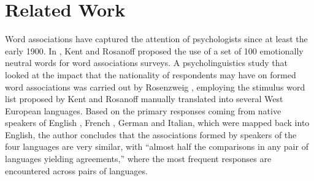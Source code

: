 \documentclass[11pt,letterpaper]{article}
\begin{document}
\section{Related Work}
Word associations have captured the attention of psychologists since at least the early 1900. In , Kent and Rosanoff proposed the use of a set of 100 emotionally neutral words for word associations surveys. %
A psycholinguistics study that looked at the impact that the nationality of respondents may have on formed word associations was carried out by Rosenzweig , employing the stimulus word list proposed by Kent and Rosanoff  manually translated into several West European languages. Based on the primary responses coming from native speakers of English%
, French%
, German %
and Italian, %
which were mapped back into English, the author concludes that the associations formed by speakers of the four languages are very similar, with ``almost half the comparisons in any pair of languages yielding agreements,'' where the most frequent responses are encountered across pairs of languages. %
\end{document}
